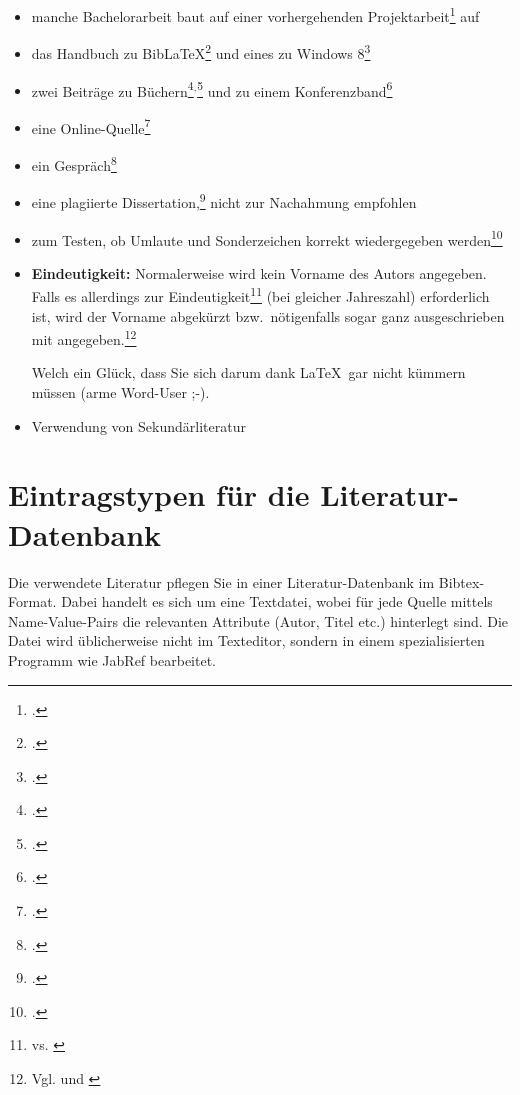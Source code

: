 \begin{itemize}
\item manche Bachelorarbeit baut auf einer vorhergehenden Projektarbeit\footcite{mayer:PA1} auf
\item das Handbuch zu BibLaTeX\footcite{biblatex:manual} und eines zu Windows 8\footcite{Win8}
\item zwei Beiträge zu Büchern\footcite{Trautwein:Nokia}${}^{,}$\footcite{Mann} und zu einem Konferenzband\footcite{Trautwein:Erfolgsfaktoren}
\item eine Online-Quelle\footcite{SAP:HANA}
\item ein Gespräch\footcite{Mueller:Gespraech}
\item eine plagiierte Dissertation,\footcite{GuttenPlag} nicht zur Nachahmung empfohlen
\item zum Testen, ob Umlaute und Sonderzeichen korrekt wiedergegeben werden\footcite{Umlauttest}
\item \textbf{Eindeutigkeit:} Normalerweise wird kein Vorname des Autors angegeben. Falls es allerdings zur Eindeutigkeit\footnote{\cite{trautwein2011unternehmensplanspiele} vs. \cite{hitzler2011optimierung}} (bei gleicher Jahreszahl) erforderlich ist, wird der Vorname abgekürzt bzw.\ nötigenfalls sogar ganz ausgeschrieben mit angegeben.\footnote{Vgl. \cite{mayer:PA1} und \cite{mayerLukas:PA1}}
 
Welch ein Glück, dass Sie sich darum dank \LaTeX\ gar nicht kümmern müssen (arme Word\texttrademark-User ;-).

\item Verwendung von Sekundärliteratur
\end{itemize}


\section{Eintragstypen für die Literatur-Datenbank}

Die verwendete Literatur pflegen Sie in einer Literatur-Datenbank im Bibtex-Format. Dabei handelt es sich um eine Textdatei, wobei für jede Quelle mittels Name-Value-Pairs die relevanten Attribute (Autor, Titel etc.) hinterlegt sind. Die Datei wird üblicherweise nicht im Texteditor, sondern in einem spezialisierten Programm wie JabRef bearbeitet.

